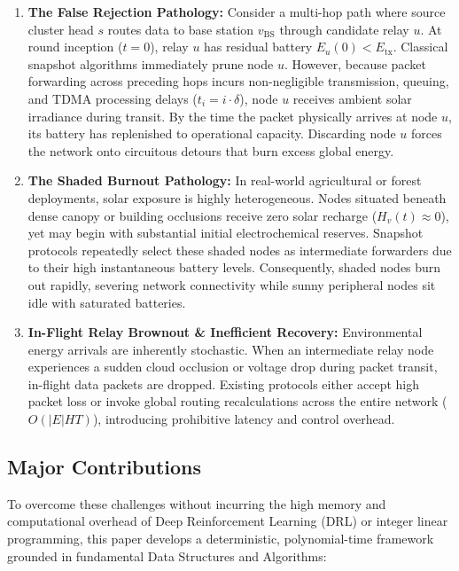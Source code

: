 \documentclass[journal]{IEEEtran}
\begin{document}
\begin{enumerate}
    \item \textbf{The False Rejection Pathology:} Consider a multi-hop path where source cluster head $s$ routes data to base station $v_{\text{BS}}$ through candidate relay $u$. At round inception ($t = 0$), relay $u$ has residual battery $E_u(0) < E_{\text{tx}}$. Classical snapshot algorithms immediately prune node $u$. However, because packet forwarding across preceding hops incurs non-negligible transmission, queuing, and TDMA processing delays ($t_i = i \cdot \delta$), node $u$ receives ambient solar irradiance during transit. By the time the packet physically arrives at node $u$, its battery has replenished to operational capacity. Discarding node $u$ forces the network onto circuitous detours that burn excess global energy.
    \item \textbf{The Shaded Burnout Pathology:} In real-world agricultural or forest deployments, solar exposure is highly heterogeneous. Nodes situated beneath dense canopy or building occlusions receive zero solar recharge ($H_v(t) \approx 0$), yet may begin with substantial initial electrochemical reserves. Snapshot protocols repeatedly select these shaded nodes as intermediate forwarders due to their high instantaneous battery levels. Consequently, shaded nodes burn out rapidly, severing network connectivity while sunny peripheral nodes sit idle with saturated batteries.
    \item \textbf{In-Flight Relay Brownout \& Inefficient Recovery:} Environmental energy arrivals are inherently stochastic. When an intermediate relay node experiences a sudden cloud occlusion or voltage drop during packet transit, in-flight data packets are dropped. Existing protocols either accept high packet loss or invoke global routing recalculations across the entire network ($O(|E|HT)$), introducing prohibitive latency and control overhead.
\end{enumerate}

\subsection{Major Contributions}
To overcome these challenges without incurring the high memory and computational overhead of Deep Reinforcement Learning (DRL) or integer linear programming, this paper develops a deterministic, polynomial-time framework grounded in fundamental Data Structures and Algorithms:
\end{document}
